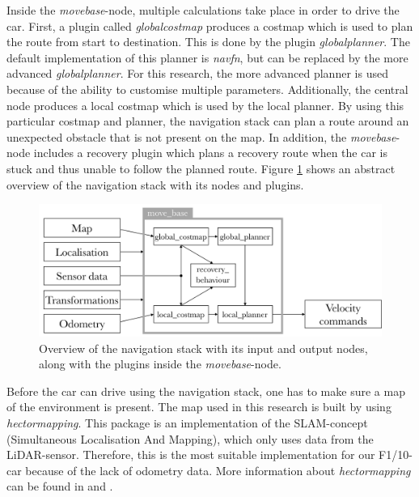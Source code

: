 \documentclass[conference,a4paper]{IEEEtran}
\begin{document}
Inside the \textit{move\textunderscore base}-node, multiple calculations take place in order to drive the car. First, a plugin called \emph{global\textunderscore costmap} produces a costmap which is used to plan the route from start to destination. This is done by the plugin \emph{global\textunderscore planner}. The default implementation of this planner is \emph{navfn}, but can be replaced by the more advanced \emph{global\textunderscore planner}. For this research, the more advanced planner is used because of the ability to customise multiple parameters. Additionally, the central node produces a local costmap which is used by the local planner. By using this particular costmap and planner, the navigation stack can plan a route around an unexpected obstacle that is not present on the map. In addition, the \emph{move\textunderscore base}-node includes a recovery plugin which plans a recovery route when the car is stuck and thus unable to follow the planned route.
Figure \ref{fig:navstack_global} shows an abstract overview of the navigation stack with its nodes and plugins. \cite{Marder-Eppstein2016_2, Zheng2016}\\

\begin{figure}[!t]
    \includegraphics[width=\columnwidth]{navstack3}
    \centering
    \caption{Overview of the navigation stack with its input and output nodes, along with the plugins inside the \emph{move\textunderscore base}-node.}
    \label{fig:navstack_global}
\end{figure}

\noindent Before the car can drive using the navigation stack, one has to make sure a map of the environment is present. The map used in this research is built by using \emph{hector\textunderscore mapping}. This package is an implementation of the SLAM-concept (Simultaneous Localisation And Mapping), which only uses data from the LiDAR-sensor. Therefore, this is the most suitable implementation for our F1/10-car because of the lack of odometry data. More information about \emph{hector\textunderscore mapping} can be found in \cite{Kohlbrecher2011} and \cite{Kohlbrecher2012}. \\
\end{document}
